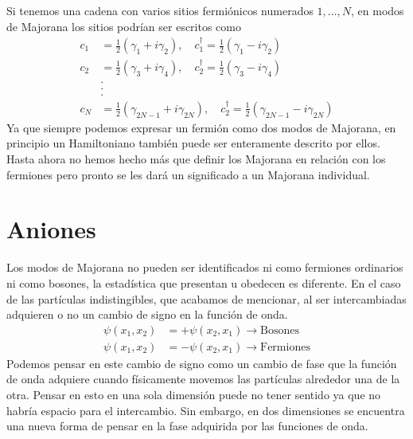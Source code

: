 Si tenemos una cadena con varios sitios fermi\'{o}nicos numerados $1,...,N$, en modos de Majorana los sitios podr\'{i}an ser escritos como 
\begin{equation}
    \begin{split}
        c_1&=\frac{1}{2}(\gamma_1+i\gamma_2),\quad c^\dagger_1=\frac{1}{2}(\gamma_1-i\gamma_2)\\
        c_2&=\frac{1}{2}(\gamma_3+i\gamma_4),\quad c^\dagger_2=\frac{1}{2}(\gamma_3-i\gamma_4)\\
        &.\\
        &.\\
        &.\\
        c_N&=\frac{1}{2}(\gamma_{2N-1}+i\gamma_{2N}),\quad c^\dagger_2=\frac{1}{2}(\gamma_{2N-1}-i\gamma_{2N})
    \end{split}
\end{equation}
Ya que siempre podemos expresar un fermi\'{o}n como dos modos de Majorana, en principio un Hamiltoniano tambi\'{e}n puede ser enteramente descrito por ellos. Hasta ahora no hemos hecho m\'{a}s que definir los Majorana en relaci\'{o}n con los fermiones pero pronto se les dar\'{a} un significado a un Majorana individual.
%
%
%
\section{Aniones}
Los modos de Majorana no pueden ser identificados ni como fermiones ordinarios ni como bosones, la estad\'{i}stica que presentan u obedecen es diferente. En el caso de las part\'{i}culas indistingibles, que acabamos de mencionar, al ser intercambiadas adquieren o no un cambio de signo en la funci\'{o}n de onda. 
\begin{equation}
\begin{split}    \psi(x_1,x_2)&=+\psi(x_2,x_1)\rightarrow\text{Bosones}\\
    \psi(x_1,x_2)&=-\psi(x_2,x_1)\rightarrow\text{Fermiones}
\end{split}
\end{equation}
Podemos pensar en este cambio de signo como un cambio de fase que la funci\'{o}n de onda adquiere cuando f\'{i}sicamente movemos las part\'{i}culas alrededor una de la otra. Pensar en esto en una sola dimensi\'{o}n puede no tener sentido ya que no habr\'{i}a espacio para el intercambio. Sin embargo, en dos dimensiones se encuentra una nueva forma de pensar en la fase adquirida por las funciones de onda. 

